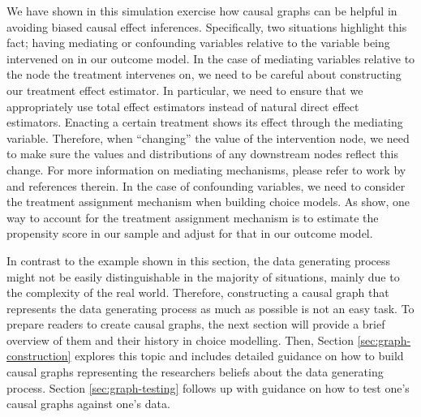 We have shown in this simulation exercise how causal graphs can be helpful in avoiding biased causal effect inferences.
Specifically, two situations highlight this fact; having mediating or confounding variables relative to the variable being intervened on in our outcome model.
In the case of mediating variables relative to the node the treatment intervenes on, we need to be careful about constructing our treatment effect estimator.
In particular, we need to ensure that we appropriately use total effect estimators instead of natural direct effect estimators.
Enacting a certain treatment shows its effect through the mediating variable.
Therefore, when ``changing'' the value of the intervention node, we need to make sure the values and distributions of any downstream nodes reflect this change.
For more information on mediating mechanisms, please refer to work by \citet{pearl_2012_mediation} and references therein.
In the case of confounding variables, we need to consider the treatment assignment mechanism when building choice models.
As \citep{hahn_2020_bayesian} show, one way to account for the treatment assignment mechanism is to estimate the propensity score in our sample and adjust for that in our outcome model.

In contrast to the example shown in this section, the data generating process might not be easily distinguishable in the majority of situations, mainly due to the complexity of the real world.
Therefore, constructing a causal graph that represents the data generating process as much as possible is not an easy task.
To prepare readers to create causal graphs, the next section will provide a brief overview of them and their history in choice modelling.
Then, Section \ref{sec:graph-construction} explores this topic and includes detailed guidance on how to build causal graphs representing the researchers beliefs about the data generating process.
Section \ref{sec:graph-testing} follows up with guidance on how to test one's causal graphs against one's data.
